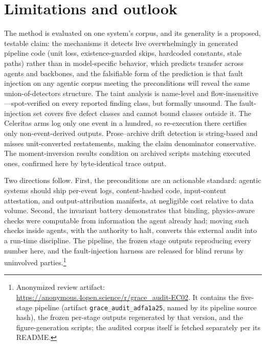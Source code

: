 \documentclass{article}
\begin{document}
\section{Limitations and outlook}
\label{sec:limitations}

The method is evaluated on one system's corpus, and its generality is a proposed, testable claim: the mechanisms it detects live overwhelmingly in generated pipeline code (unit loss, existence-guarded skips, hardcoded constants, stale paths) rather than in model-specific behavior, which predicts transfer across agents and backbones, and the falsifiable form of the prediction is that fault injection on any agentic corpus meeting the preconditions will reveal the same union-of-detectors structure. The taint analysis is name-level and flow-insensitive---spot-verified on every reported finding class, but formally unsound. The fault-injection set covers five defect classes and cannot bound classes outside it. The Celeritas arms log only one event in a hundred, so re-execution there certifies only non-event-derived outputs. Prose--archive drift detection is string-based and misses unit-converted restatements, making the claim denominator conservative. The moment-inversion results condition on archived scripts matching executed ones, confirmed here by byte-identical trace output.

Two directions follow. First, the preconditions are an actionable standard: agentic systems should ship per-event logs, content-hashed code, input-content attestation, and output-attribution manifests, at negligible cost relative to data volume. Second, the invariant battery demonstrates that binding, physics-aware checks were computable from information the agent already had; moving such checks inside agents, with the authority to halt, converts this external audit into a run-time discipline. The pipeline, the frozen stage outputs reproducing every number here, and the fault-injection harness are released for blind reruns by uninvolved parties.\footnote{Anonymized review artifact: \url{https://anonymous.4open.science/r/grace_audit-EC02}. It contains the five-stage pipeline (artifact \texttt{grace\_audit\_adfa1a25}, named by its pipeline source hash), the frozen per-stage outputs regenerated by that version, and the figure-generation scripts; the audited corpus itself is fetched separately per its README.}

\end{document}
